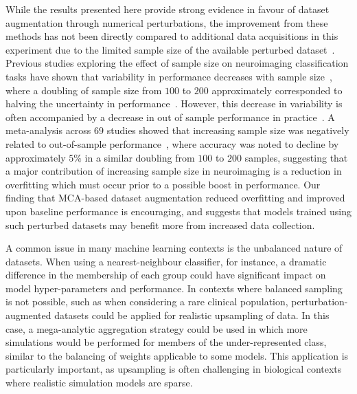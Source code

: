\documentclass[num-refs]{nbdt-article}
\begin{document}
While the results presented here provide strong evidence in favour of dataset augmentation through numerical perturbations, the improvement from these methods has not been directly compared to additional data acquisitions in this experiment due to the limited sample size of the available perturbed dataset~\cite{Kiar2020-yz}. Previous studies exploring the effect of sample size on neuroimaging classification tasks have shown that variability in performance decreases with sample size~\cite{chu2012does}, where a doubling of sample size from $100$ to $200$ approximately corresponded to halving the uncertainty in performance~\cite{varoquaux2018cross}. However, this decrease in variability is often accompanied by a decrease in out of sample performance in practice~\cite{schnack2016detecting}. A meta-analysis across $69$ studies showed that increasing sample size was negatively related to out-of-sample performance~\cite{pulini2019classification}, where accuracy was noted to decline by approximately $5\%$ in a similar doubling from $100$ to $200$ samples, suggesting that a major contribution of increasing sample size in neuroimaging is a reduction in overfitting which must occur prior to a possible boost in performance. Our finding that MCA-based dataset augmentation reduced overfitting and improved upon baseline performance is encouraging, and suggests that models trained using such perturbed datasets may benefit more from increased data collection.

A common issue in many machine learning contexts is the unbalanced nature of datasets. When using a nearest-neighbour classifier, for instance, a dramatic difference in the membership of each group could have significant impact on model hyper-parameters and performance. In contexts where balanced sampling is not possible, such as when considering a rare clinical population, perturbation-augmented datasets could be applied for realistic upsampling of data. In this case, a mega-analytic aggregation strategy could be used in which more simulations would be performed for members of the under-represented class, similar to the balancing of weights applicable to some models. This application is particularly important, as upsampling is often challenging in biological contexts where realistic simulation models are sparse.
\end{document}
